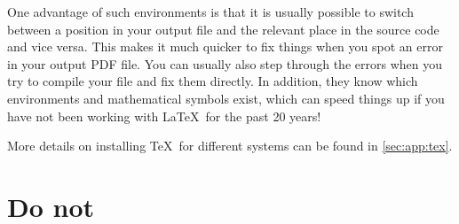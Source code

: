 One advantage of such environments is that it is usually
possible to switch between a position in your output file
and the relevant place in the source code and vice versa.
This makes it much quicker to fix
things when you spot an error in your output PDF file. You can usually
also step through the errors when you try to compile your file and fix
them directly. In addition, they know which environments and
mathematical symbols exist, which can speed things up if you have not
been working with \LaTeX\ for the past 20 years!

More details on installing \TeX\ for different systems can be found
in \cref{sec:app:tex}.


\section{Do not}
\label{sec:tips:dont}

